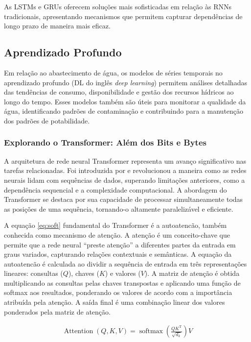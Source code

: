  As LSTMs e GRUs oferecem soluções mais sofisticadas em relação às RNNs tradicionais, apresentando mecanismos que permitem capturar dependências de longo prazo de maneira mais eficaz.
 
 \subsection{Aprendizado Profundo}
 
 Em relação ao abastecimento de água, os modelos de séries temporais no aprendizado profundo (DL do inglês \textit{deep learning}) permitem análises detalhadas das tendências de consumo, disponibilidade e gestão dos recursos hídricos ao longo do tempo. Esses modelos também são úteis para monitorar a qualidade da água, identificando padrões de contaminação e contribuindo para a manutenção dos padrões de potabilidade. 
 
 \subsubsection{Explorando o Transformer: Al\'em dos Bits e Bytes}
 
 A arquitetura de rede neural Transformer representa um avanço significativo nas  tarefas relacionadas. Foi introduzida por \cite{vaswani2017attention} e revolucionou a maneira como as redes neurais lidam com sequências de dados, superando limitações anteriores, como a dependência sequencial e a complexidade computacional. A abordagem do Transformer se destaca por sua capacidade de processar simultaneamente todas as posições de uma sequência, tornando-o altamente paralelizável e eficiente.
 
 A equação \eqref{eq:soft} fundamental do Transformer é a autoatencão, também conhecida como mecanismo de atenção. A atenção é um conceito-chave que permite que a rede neural ``preste atenção'' a diferentes partes da entrada em graus variados, capturando relações contextuais e semânticas. A equação da autoatencão é calculada ao dividir a sequência de entrada em três representações lineares: consultas ($Q$), chaves ($K$) e valores ($V$). A matriz de atenção é obtida multiplicando as consultas pelas chaves transpostas e aplicando uma função de softmax aos resultados, ponderando os valores de acordo com a importância atribuída pela atenção. A saída final é uma combinação linear dos valores ponderados pela matriz de atenção.
 
 \begin{eqnarray}
 	\operatorname{Attention}(Q, K, V)=\operatorname{softmax}\left(\frac{Q K^{\mathrm{T}}}{\sqrt{d_k}}\right) V \label{eq:soft}
 \end{eqnarray}
 
